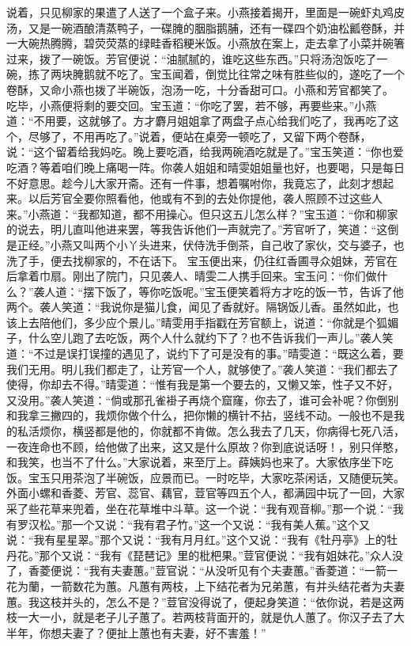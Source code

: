 \documentclass[12pt,oneside]{book}
\begin{document}
说着，只见柳家的果遣了人送了一个盒子来。小燕接着揭开，里面是一碗虾丸鸡皮汤，又是一碗酒酿清蒸鸭子，一碟腌的胭脂鹅脯，还有一碟四个奶油松瓤卷酥，并一大碗热腾腾，碧荧荧蒸的绿畦香稻粳米饭。小燕放在案上，走去拿了小菜并碗箸过来，拨了一碗饭。芳官便说：“油腻腻的，谁吃这些东西。”只将汤泡饭吃了一碗，拣了两块腌鹅就不吃了。宝玉闻着，倒觉比往常之味有胜些似的，遂吃了一个卷酥，又命小燕也拨了半碗饭，泡汤一吃，十分香甜可口。小燕和芳官都笑了。
吃毕，小燕便将剩的要交回。宝玉道：“你吃了罢，若不够，再要些来。”小燕道：“不用要，这就够了。方才麝月姐姐拿了两盘子点心给我们吃了，我再吃了这个，尽够了，不用再吃了。”说着，便站在桌旁一顿吃了，又留下两个卷酥，说：“这个留着给我妈吃。晚上要吃酒，给我两碗酒吃就是了。”宝玉笑道：“你也爱吃酒？等着咱们晚上痛喝一阵。你袭人姐姐和晴雯姐姐量也好，也要喝，只是每日不好意思。趁今儿大家开斋。还有一件事，想着嘱咐你，我竟忘了，此刻才想起来。以后芳官全要你照看他，他或有不到的去处你提他，袭人照顾不过这些人来。”小燕道：“我都知道，都不用操心。但只这五儿怎么样？”宝玉道：“你和柳家的说去，明儿直叫他进来罢，等我告诉他们一声就完了。”芳官听了，笑道：“这倒是正经。”小燕又叫两个小丫头进来，伏侍洗手倒茶，自己收了家伙，交与婆子，也洗了手，便去找柳家的，不在话下。
宝玉便出来，仍往红香圃寻众姐妹，芳官在后拿着巾扇。刚出了院门，只见袭人、晴雯二人携手回来。宝玉问：“你们做什么？”袭人道：“摆下饭了，等你吃饭呢。”宝玉便笑着将方才吃的饭一节，告诉了他两个。袭人笑道：“我说你是猫儿食，闻见了香就好。隔锅饭儿香。虽然如此，也该上去陪他们，多少应个景儿。”晴雯用手指戳在芳官额上，说道：“你就是个狐媚子，什么空儿跑了去吃饭，两个人什么就约下了？也不告诉我们一声儿。”袭人笑道：“不过是误打误撞的遇见了，说约下了可是没有的事。”晴雯道：“既这么着，要我们无用。明儿我们都走了，让芳官一个人，就够使了。”袭人笑道：“我们都去了使得，你却去不得。”晴雯道：“惟有我是第一个要去的，又懒又笨，性子又不好，又没用。”袭人笑道：“倘或那孔雀褂子再烧个窟窿，你去了，谁可会补呢？你倒别和我拿三撇四的，我烦你做个什么，把你懒的横针不拈，竖线不动。一般也不是我的私活烦你，横竖都是他的，你就都不肯做。怎么我去了几天，你病得七死八活，一夜连命也不顾，给他做了出来，这又是什么原故？你到底说话呀！，别只佯憨，和我笑，也当不了什么。”大家说着，来至厅上。薛姨妈也来了。大家依序坐下吃饭。宝玉只用茶泡了半碗饭，应景而已。一时吃毕，大家吃茶闲话，又随便玩笑。
外面小螺和香菱、芳官、蕊官、藕官，荳官等四五个人，都满园中玩了一回，大家采了些花草来兜着，坐在花草堆中斗草。这一个说：“我有观音柳。”那一个说：“我有罗汉松。”那一个又说：“我有君子竹。”这一个又说：“我有美人蕉。”这个又说：“我有星星翠。”那个又说：“我有月月红。”这个又说：“我有《牡丹亭》上的牡丹花。”那个又说：“我有《琵琶记》里的枇杷果。”荳官便说：“我有姐妹花。”众人没了，香菱便说：“我有夫妻蕙。”荳官说：“从没听见有个夫妻蕙。”香菱道：“一箭一花为蘭，一箭数花为蕙。凡蕙有两枝，上下结花者为兄弟蕙，有并头结花者为夫妻蕙。我这枝并头的，怎么不是？”荳官没得说了，便起身笑道：“依你说，若是这两枝一大一小，就是老子儿子蕙了。若两枝背面开的，就是仇人蕙了。你汉子去了大半年，你想夫妻了？便扯上蕙也有夫妻，好不害羞！”
\end{document}
